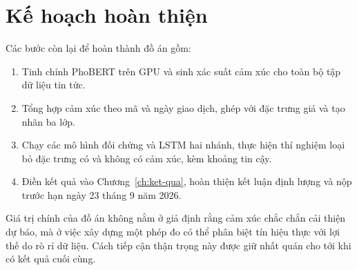\section{Kế hoạch hoàn thiện}

Các bước còn lại để hoàn thành đồ án gồm:

\begin{enumerate}[nosep]
  \item Tinh chỉnh PhoBERT trên GPU và sinh xác suất cảm xúc cho toàn bộ tập dữ liệu tin tức.
  \item Tổng hợp cảm xúc theo mã và ngày giao dịch, ghép với đặc trưng giá và tạo nhãn ba lớp.
  \item Chạy các mô hình đối chứng và LSTM hai nhánh, thực hiện thí nghiệm loại bỏ đặc
        trưng có và không có cảm xúc, kèm khoảng tin cậy.
  \item Điền kết quả vào Chương~\ref{ch:ket-qua}, hoàn thiện kết luận định lượng và nộp
        trước hạn ngày 23 tháng 9 năm 2026.
\end{enumerate}

Giá trị chính của đồ án không nằm ở giả định rằng cảm xúc chắc chắn cải thiện dự báo, mà
ở việc xây dựng một phép đo có thể phân biệt tín hiệu thực với lợi thế do rò rỉ dữ liệu.
Cách tiếp cận thận trọng này được giữ nhất quán cho tới khi có kết quả cuối cùng.
